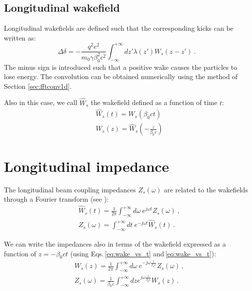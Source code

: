 \subsection{Longitudinal wakefield}

Longitudinal wakefields are defined such that the corresponding kicks can be written as:
\begin{equation}
    \Delta \delta = -\frac{q^2 e^2}{m_0 \gamma \beta_0^2 c^2} \int_{-\infty}^{+\infty} dz' \lambda(z') W_s(z-z') ~ .
\end{equation}
The minus sign is introduced such that a positive wake causes the particles to lose energy. The convolution can be obtained numerically using the method of Section \ref{sec:fftconv1d}.

Also in this case, we call $\widehat{W}_{s}$ the wakefield defined as a function of time $t$:
\begin{align}
    &\widehat{W}_{s}(t) = {W}_{s}\left(\beta_0 c t\right) \label{eq:wake_vs_t}\\
    &W_s(z) = \widehat{W}_{s}\left(-\frac{z}{\beta_0 c}\right) \label{eq:wake_vs_z}
\end{align}

\section{Longitudinal impedance}

The longitudinal beam coupling impedances $Z_{s}(\omega)$ are related to the wakefields through a Fourier transform (see \cite[Eq. 1.216]{Mounet:Thesis}):
\begin{align}
    &\widehat{W}_s(t) = \frac{1}{2\pi}\int_{-\infty}^{+\infty} d\omega \ e^{j\omega t} Z_{s}(\omega)~,\label{eq:wake_from_imp_long}\\
    &Z_s(\omega) = \int_{-\infty}^{+\infty} dt \ e^{-j\omega t} \widehat{W}_{s}(t)~.\label{eq:imp_from_wake_long}
\end{align}

We can write the impedances also in terms of the wakefield expressed as a function of $z= -\beta_0 c t$ (using Eqs.\,\ref{eq:wake_vs_t} and\,\ref{eq:wake_vs_t}):
\begin{align}
    &W_{s}(z) = \frac{1}{2\pi}\int_{-\infty}^{+\infty} d\omega \ e^{-j\omega \frac{z}{\beta_0 c}} Z_{s}(\omega)\, ,\\
    &Z_{s}(\omega) = \frac{1}{\beta_0 c} \int_{-\infty}^{+\infty} dz e^{j \omega \frac{z}{\beta_0 c}} W_{s}(z)\, .
\end{align}


